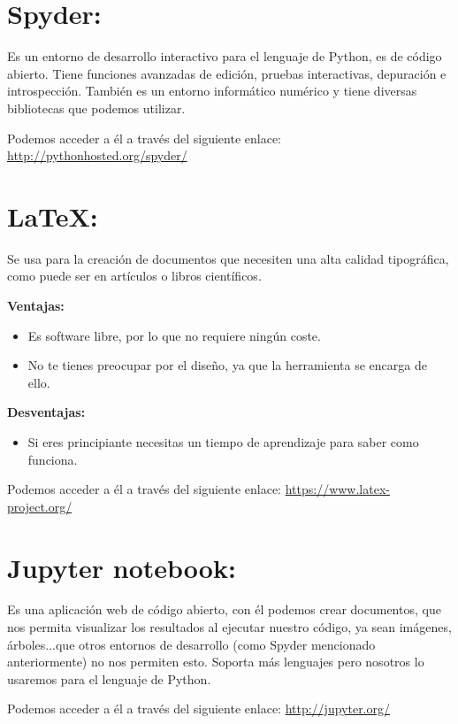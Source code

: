 \section{Spyder:}
Es un entorno de desarrollo interactivo para el lenguaje de Python, es de código abierto.
Tiene funciones avanzadas de edición, pruebas interactivas, depuración e introspección. También es un entorno informático numérico y tiene diversas bibliotecas que podemos utilizar.

Podemos acceder a él a través del siguiente enlace: 
\url{http://pythonhosted.org/spyder/}

\section{LaTeX:}
Se usa para la creación de documentos que necesiten una alta calidad tipográfica, como puede ser en artículos o libros científicos.

\textbf{Ventajas:}

\begin{itemize}
\item Es software libre, por lo que no requiere ningún coste.

\item No te tienes preocupar por el diseño, ya que la herramienta se encarga de ello.

\end{itemize}

\textbf{Desventajas:}

\begin{itemize}
\item Si eres principiante necesitas un tiempo de aprendizaje para saber como funciona.
\end{itemize}

Podemos acceder a él a través del siguiente enlace: 
\url{https://www.latex-project.org/}

\section{Jupyter notebook:}
Es una aplicación web de código abierto, con él podemos crear documentos, que nos permita visualizar los resultados al ejecutar nuestro código, ya sean imágenes, árboles...que otros entornos de desarrollo (como Spyder mencionado anteriormente) no nos permiten esto.
Soporta más lenguajes pero nosotros lo usaremos para el lenguaje de Python.

Podemos acceder a él a través del siguiente enlace: 
\url{http://jupyter.org/}	


